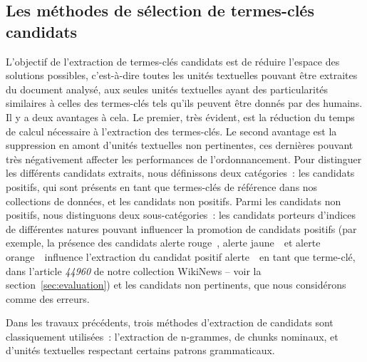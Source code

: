     \subsection{Les méthodes de sélection de termes-clés candidats}
      L'objectif de l'extraction de termes-clés candidats est de réduire
      l'espace des solutions possibles, c'est-à-dire toutes les unités
      textuelles pouvant être extraites du document analysé, aux seules unités
      textuelles ayant des particularités similaires à celles des termes-clés
      tels qu'ils peuvent être donnés par des humains. Il y a deux avantages à
      cela. Le premier, très évident, est la réduction du temps de calcul
      nécessaire à l'extraction des termes-clés. Le second avantage est la
      suppression en amont d'unités textuelles non pertinentes, ces dernières
      pouvant très négativement affecter les performances de l'ordonnancement.
      Pour distinguer les différents candidats extraits, nous définissons deux
      catégories~: les candidats positifs, qui sont présents en tant que
      termes-clés de référence dans nos collections de données, et les candidats
      non positifs. Parmi les candidats non positifs, nous distinguons deux
      sous-catégories~: les candidats porteurs d'indices de différentes natures
      pouvant influencer la promotion de candidats positifs (par exemple, la
      présence des candidats \og alerte rouge~\fg, \og alerte jaune~\fg\ et \og
      alerte orange~\fg\ influence l'extraction du candidat positif \og
      alerte~\fg\ en tant que terme-clé, dans l'article \textit{44960} de notre
      collection WikiNews -- voir la section~\ref{sec:evaluation}) et les
      candidats non pertinents, que nous considérons comme des erreurs.

      Dans les travaux précédents, trois méthodes d'extraction de candidats sont
      classiquement utilisées~: l'extraction de n-grammes, de chunks nominaux,
      et d'unités textuelles respectant certains patrons grammaticaux.

